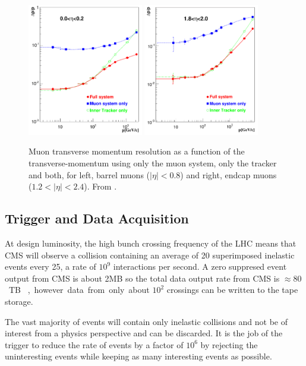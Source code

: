 \begin{figure}[htb!]
  \centering
  \includegraphics[width=0.45\textwidth]{muon_barrel}
  \includegraphics[width=0.45\textwidth]{muon_endcap}
  \caption{Muon transverse momentum resolution as a function of the
  \label{fig:MS}
transverse-momentum using only the muon system, only the tracker and both, for
left, barrel muons ($|\eta| < 0.8$) and right, endcap muons ($1.2<|\eta| <
2.4$). From \cite{cms}.}
\end{figure}


\subsection{Trigger and Data Acquisition}
At design luminosity, the high bunch crossing frequency of the LHC means that
CMS will observe a collision containing an average of 20 superimposed inelastic
events every \unit{25}{\nano\second}, a rate of $10^{9}$ interactions per
second.
A zero suppresed event output from CMS is about \unit{2}{MB} so the total data
output rate from CMS is \unit{$\approx 80$}{TB \per \second},  however data from
only about $10^{2}$ crossings can be written to the tape storage. 

The vast majority of events will contain only inelastic collisions and not be of
interest from a physics perspective and can be discarded.  
It is the job of the trigger to reduce the rate of events
by a factor of $10^6$ by rejecting the uninteresting events while keeping as
many interesting events as possible.

